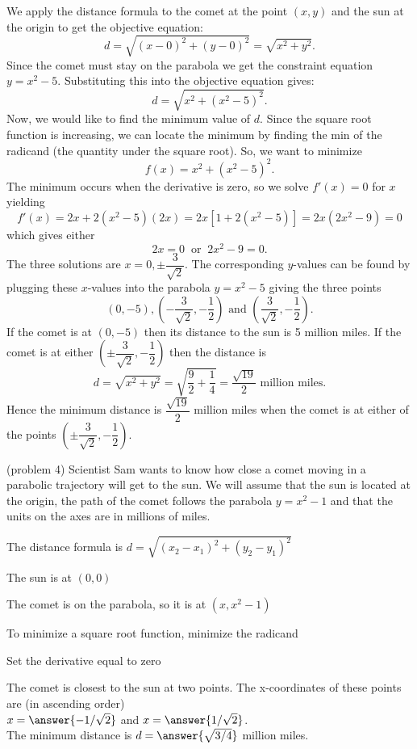 \documentclass[handout]{ximera}
\begin{document}
\begin{example}[example 4]
We apply the distance formula to the comet at the point $(x, y)$ and the sun at the origin to get the objective equation:
\[d = \sqrt{(x-0)^2 + (y-0)^2} = \sqrt{x^2 + y^2}.\]
Since the comet must stay on the parabola we get the constraint equation $y = x^2 - 5$.  Substituting this into the objective equation gives:
\[d = \sqrt{x^2 + (x^2 - 5)^2}.\]
Now, we would like to find the minimum value of $d$. Since the square root function is increasing, 
we can locate the minimum by finding the min of the radicand (the quantity under the square root).
So, we want to minimize 
\[
f(x) = x^2 + (x^2 - 5)^2.
\]
The minimum occurs when the derivative is zero, so we solve
$f'(x) = 0$ for $x$ yielding
\[f'(x) = 2x + 2(x^2 - 5)(2x) = 2x[1+ 2(x^2 - 5)] = 2x(2x^2 - 9) = 0\]
which gives either 
\[2x = 0 \;\; \text{or} \;\; 2x^2 - 9 = 0.\]
The three solutions are $x = 0, \pm \dfrac{3}{\sqrt2}$.
The corresponding $y$-values can be found by plugging these $x$-values into the parabola $y = x^2 - 5$
giving the three points
\[(0, -5), \left(-\dfrac{3}{\sqrt 2}, -\dfrac12 \right) \mbox{ and } \left(\dfrac{3}{\sqrt 2}, -\dfrac12 \right).\]
If the comet is at $(0, -5)$ then its distance to the sun is 5 million miles.  If the comet is at 
either $\left(\pm\dfrac{3}{\sqrt 2}, -\dfrac12\right)$ then the distance is 
\[d = \sqrt{x^2 + y^2} = \sqrt{{\frac{9}{2} + \frac14}} = \frac{\sqrt {19}}{2} \mbox{ million miles}.\]
Hence the minimum distance is $\dfrac{\sqrt{19}}{2}$ million miles when the comet is at either of the points 
$\left(\pm\dfrac{3}{\sqrt 2}, -\dfrac12 \right)$.
\end{example}

\begin{problem}(problem 4)
Scientist Sam wants to know how close a comet moving in a parabolic trajectory will get to the sun. 
We will assume that the sun is located at the origin, 
the path of the comet follows the parabola $y = x^2 - 1$ and that the units 
on the axes are in millions of miles.



\begin{hint}
The distance formula is $d = \sqrt{(x_2 - x_1)^2 + (y_2 - y_1)^2}$
\end{hint}
\begin{hint}
The sun is at $(0,0)$
\end{hint}
\begin{hint}
The comet is on the parabola, so it is at $(x, x^2 - 1)$
\end{hint}
\begin{hint}
To minimize a square root function, minimize the radicand
\end{hint}
\begin{hint}
Set the derivative equal to zero
\end{hint}

The comet is closest to the sun at two points.
 The x-coordinates of these points are (in ascending order)\\
$x =  \answer{-1/\sqrt2}$ and $x = \answer{1/\sqrt2}$.\\
The minimum distance is $d = \answer{\sqrt{3/4}}$ million miles.
\end{problem}
\end{document}
